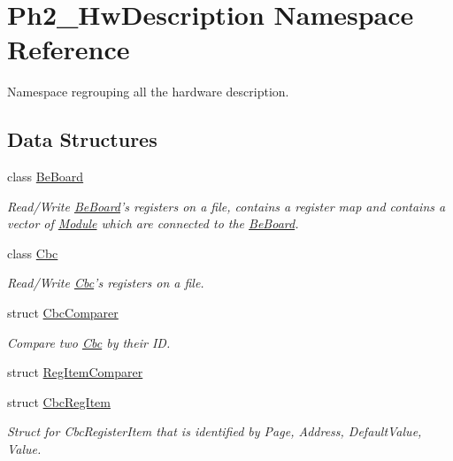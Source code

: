 \hypertarget{namespace_ph2___hw_description}{\section{Ph2\-\_\-\-Hw\-Description Namespace Reference}
\label{namespace_ph2___hw_description}
}


Namespace regrouping all the hardware description.  


\subsection*{Data Structures}
\begin{DoxyCompactItemize}
\item 
class \hyperlink{class_ph2___hw_description_1_1_be_board}{Be\-Board}
\begin{DoxyCompactList}\small\item\em Read/\-Write \hyperlink{class_ph2___hw_description_1_1_be_board}{Be\-Board}'s registers on a file, contains a register map and contains a vector of \hyperlink{class_ph2___hw_description_1_1_module}{Module} which are connected to the \hyperlink{class_ph2___hw_description_1_1_be_board}{Be\-Board}. \end{DoxyCompactList}\item 
class \hyperlink{class_ph2___hw_description_1_1_cbc}{Cbc}
\begin{DoxyCompactList}\small\item\em Read/\-Write \hyperlink{class_ph2___hw_description_1_1_cbc}{Cbc}'s registers on a file. \end{DoxyCompactList}\item 
struct \hyperlink{struct_ph2___hw_description_1_1_cbc_comparer}{Cbc\-Comparer}
\begin{DoxyCompactList}\small\item\em Compare two \hyperlink{class_ph2___hw_description_1_1_cbc}{Cbc} by their I\-D. \end{DoxyCompactList}\item 
struct \hyperlink{struct_ph2___hw_description_1_1_reg_item_comparer}{Reg\-Item\-Comparer}
\item 
struct \hyperlink{struct_ph2___hw_description_1_1_cbc_reg_item}{Cbc\-Reg\-Item}
\begin{DoxyCompactList}\small\item\em Struct for Cbc\-Register\-Item that is identified by Page, Address, Default\-Value, Value. \end{DoxyCompactList}\item 

\end{DoxyCompactItemize}
